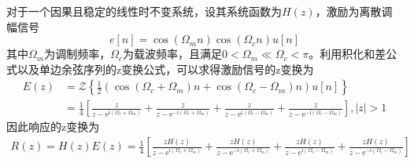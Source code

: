 \documentclass{ctexbook}
\begin{document}
\begin{example}
    对于一个因果且稳定的线性时不变系统，设其系统函数为$H(z)$，激励为离散调幅信号
    $$e[n]=\cos(\Omega_m n)\cos(\Omega_c n)u[n]$$
    其中$\Omega_m$为调制频率，$\Omega_c$为载波频率，且满足$0<\Omega_m\ll\Omega_c<\pi$。利用积化和差公式以及单边余弦序列的z变换公式，可以求得激励信号的z变换为
    \begin{align*}
        E(z)&=\mathcal{Z}\left\{\frac{1}{2}\left(\cos(\Omega_c+\Omega_m)n+\cos(\Omega_c-\Omega_m)n\right)u[n]\right\}\\
        &=\frac{1}{4}\left[\frac{z}{z-\mathrm{e}^{\mathrm{i}(\Omega_c+\Omega_m)}}+\frac{z}{z-\mathrm{e}^{-\mathrm{i}(\Omega_c+\Omega_m)}}+\frac{z}{z-\mathrm{e}^{\mathrm{i}(\Omega_c-\Omega_m)}}+\frac{z}{z-\mathrm{e}^{-\mathrm{i}(\Omega_c-\Omega_m)}}\right],|z|>1
    \end{align*}
    因此响应的z变换为
    \begin{align*}
        R(z)=H(z)E(z)=\frac{1}{4}\left[\frac{zH(z)}{z-\mathrm{e}^{\mathrm{i}(\Omega_c+\Omega_m)}}+\frac{zH(z)}{z-\mathrm{e}^{-\mathrm{i}(\Omega_c+\Omega_m)}}+\frac{zH(z)}{z-\mathrm{e}^{\mathrm{i}(\Omega_c-\Omega_m)}}+\frac{zH(z)}{z-\mathrm{e}^{-\mathrm{i}(\Omega_c-\Omega_m)}}\right]
    \end{align*}


\end{example}
\end{document}

